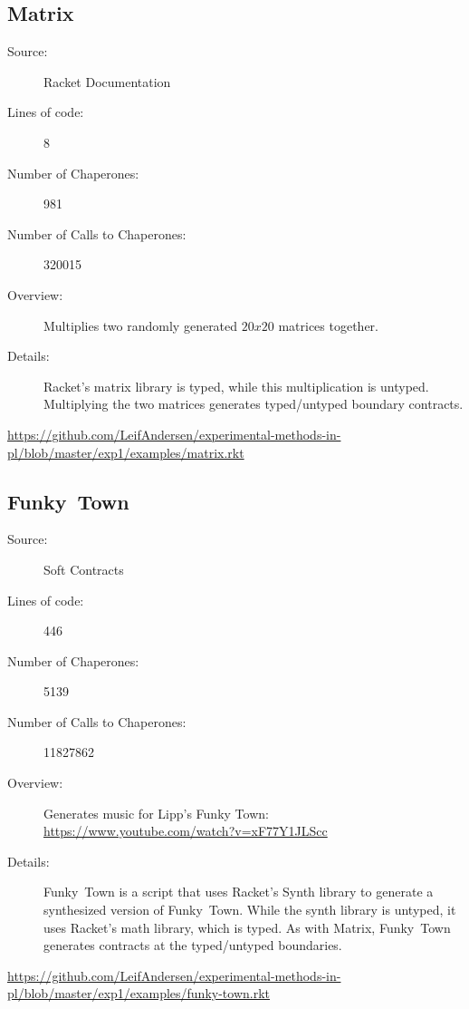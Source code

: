 \subsection*{Matrix~\hrulefill}
\begin{description}
\item[Source:] Racket Documentation
\item[Lines of code:] 8
\item[Number of Chaperones:] 981
\item[Number of Calls to Chaperones:] 320015
\item[Overview:]
  Multiplies two randomly generated $20x20$ matrices together.
\item[Details:]
  Racket's matrix library is typed, while this multiplication is untyped.
  Multiplying the two matrices generates typed/untyped boundary contracts.
\end{description}
\url{https://github.com/LeifAndersen/experimental-methods-in-pl/blob/master/exp1/examples/matrix.rkt}

\subsection*{Funky~Town~\hrulefill}
\begin{description}
\item[Source:] Soft Contracts
\item[Lines of code:] 446
\item[Number of Chaperones:] 5139
\item[Number of Calls to Chaperones:] 11827862
\item[Overview:]
  Generates music for Lipp's Funky Town:\\
  \url{https://www.youtube.com/watch?v=xF77Y1JLScc}
\item[Details:]
  Funky~Town is a script that uses Racket's Synth library to generate a synthesized version of Funky~Town.
  While the synth library is untyped, it uses Racket's math library, which is typed.
  As with Matrix, Funky~Town generates contracts at the typed/untyped boundaries.
\end{description}
\url{https://github.com/LeifAndersen/experimental-methods-in-pl/blob/master/exp1/examples/funky-town.rkt}

